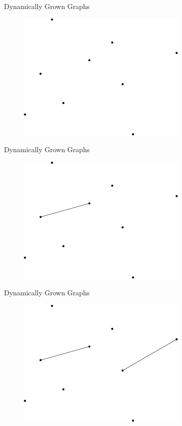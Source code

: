 \documentclass{beamer}
\begin{document}
\begin{frame}{Dynamically Grown Graphs}
	\begin{figure}[H]
		\centering
		\includegraphics[scale=1]{fig/graph-1.pdf}
	\end{figure}
\end{frame}
\begin{frame}{Dynamically Grown Graphs}
        \begin{figure}[H]
                \centering
                \includegraphics[scale=1]{fig/graph-2.pdf}
        \end{figure}
\end{frame}
\begin{frame}{Dynamically Grown Graphs}
        \begin{figure}[H]
                \centering
                \includegraphics[scale=1]{fig/graph-3.pdf}
        \end{figure}
\end{frame}
\end{document}
